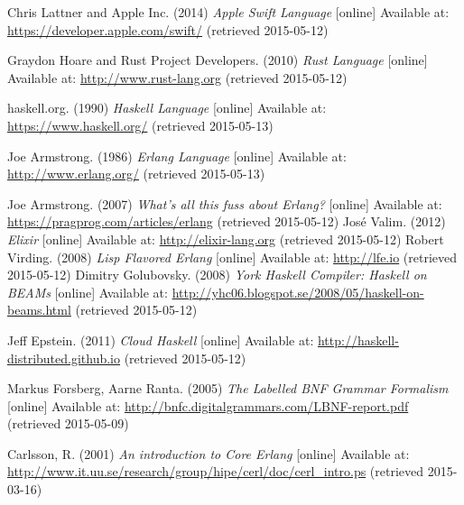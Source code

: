 \begin{thebibliography}{69}


 Chris Lattner and Apple Inc. (2014) \textit{Apple Swift Language} [online] Available at: \url{https://developer.apple.com/swift/} (retrieved 2015-05-12)

 Graydon Hoare and Rust Project Developers. (2010) \textit{Rust Language} [online] Available at: \url{http://www.rust-lang.org} (retrieved 2015-05-12)

 haskell.org. (1990) \textit{Haskell Language} [online] Available at: \url{https://www.haskell.org/} (retrieved 2015-05-13)

 Joe Armstrong. (1986) \textit{Erlang Language} [online] Available at: \url{http://www.erlang.org/} (retrieved 2015-05-13)

 Joe Armstrong. (2007) \textit{What's all this fuss about Erlang?} [online] Available at: \url{https://pragprog.com/articles/erlang} (retrieved 2015-05-12)
  José Valim. (2012) \textit{Elixir} [online] Available at: \url{http://elixir-lang.org} (retrieved 2015-05-12)
  Robert Virding. (2008) \textit{Lisp Flavored Erlang} [online] Available at: \url{http://lfe.io} (retrieved 2015-05-12)
  Dimitry Golubovsky. (2008) \textit{York Haskell Compiler: Haskell on BEAMs} [online] Available at: \url{http://yhc06.blogspot.se/2008/05/haskell-on-beams.html} (retrieved 2015-05-12)

  Jeff Epstein. (2011) \textit{Cloud Haskell} [online] Available at: \url{http://haskell-distributed.github.io} (retrieved 2015-05-12)

 Markus Forsberg, Aarne Ranta. (2005) \textit{The Labelled BNF Grammar Formalism} [online] Available at: \url{http://bnfc.digitalgrammars.com/LBNF-report.pdf} (retrieved 2015-05-09)

 Carlsson, R. (2001) \textit{An introduction to Core Erlang} [online] Available at: \url{http://www.it.uu.se/research/group/hipe/cerl/doc/cerl_intro.ps} (retrieved 2015-03-16)



\end{thebibliography}
